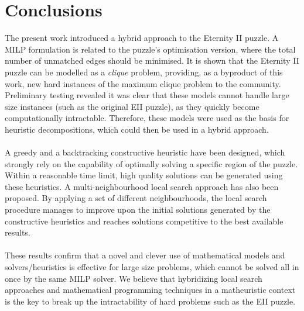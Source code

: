 \documentclass[preprint,12pt]{elsarticle}
\begin{document}

\section{Conclusions}
\label{sec:e2conclusion}

\noindent
The present work introduced a hybrid approach to the Eternity II puzzle. 
A MILP formulation is related to the puzzle's optimisation version, where the total number of unmatched edges should be minimised.
It is shown that the Eternity II puzzle can be modelled as a \textit{clique} problem, providing, as a byproduct of this work, new hard instances of the maximum clique problem to the community.
Preliminary testing revealed it was clear that these models cannot handle large size instances (such as the original EII puzzle), as they quickly become computationally intractable.
Therefore, these models were used as the basis for heuristic decompositions, which could then be used in a hybrid approach.
\\
\\
A greedy and a backtracking constructive heuristic have been designed, which strongly rely on the capability of optimally solving a specific region of the puzzle.
Within a reasonable time limit, high quality solutions can be generated using these heuristics.
A multi-neighbourhood local search approach has also been proposed.
By applying a set of different neighbourhoods, 
the local search procedure manages to improve upon the initial solutions generated by the constructive heuristics and reaches solutions competitive to the best available results. 
\\
\\
These results confirm that a novel and clever use of mathematical models and solvers/heuristics is effective for large size problems, which cannot be solved all in once by the same MILP solver.
We believe that 
hybridizing local search approaches and mathematical programming techniques in a matheuristic context
is the key to break up the intractability of hard problems such as the EII puzzle.

%
%

\end{document}
